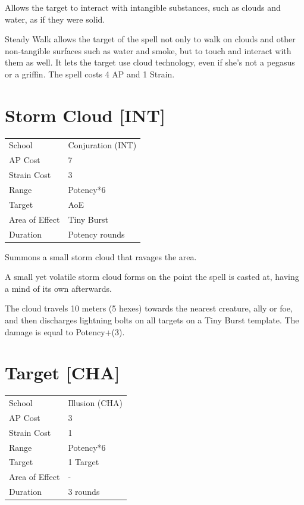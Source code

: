 \documentclass[11pt,a4paper,twocolumn]{book}
\begin{document}
\medskip

Allows the target to interact with intangible substances, such as clouds and water, as if they were solid.

Steady Walk allows the target of the spell not only to walk on clouds and other non-tangible surfaces such as water and smoke, but to touch and interact with them as well. It lets the target use cloud technology, even if she's not a pegasus or a griffin. The spell costs 4 AP and 1 Strain.


\section*{Storm Cloud [INT]}
{
	\begin{tabu} to 75mm{| X[l,4] | X[l,7] |}
		\hline
		School 			& Conjuration (INT)		\\
        AP Cost	      	& 7 					\\
        Strain Cost     & 3 					\\
        Range     		& Potency*6 			\\
        Target      	& AoE					\\
        Area of Effect  & Tiny Burst 	 		\\
        Duration     	& Potency rounds		\\ \hline
	\end{tabu}
		
}

\medskip

Summons a small storm cloud that ravages the area.

A small yet volatile storm cloud forms on the point the spell is casted at, having a mind of its own afterwards.

The cloud travels 10 meters (5 hexes) towards the nearest creature, ally or foe, and then discharges lightning bolts on all targets on a Tiny Burst template. The damage is equal to Potency+(3).


\section*{Target [CHA]}
{
	\begin{tabu} to 75mm{| X[l,4] | X[l,7] |}
		\hline
		School 			& Illusion (CHA) 		\\
        AP Cost	      	& 3 					\\
        Strain Cost     & 1 					\\
        Range     		& Potency*6 			\\
        Target      	& 1 Target				\\
        Area of Effect  & - 	 				\\
        Duration     	& 3 rounds				\\ \hline
	\end{tabu}
		
}
\end{document}
